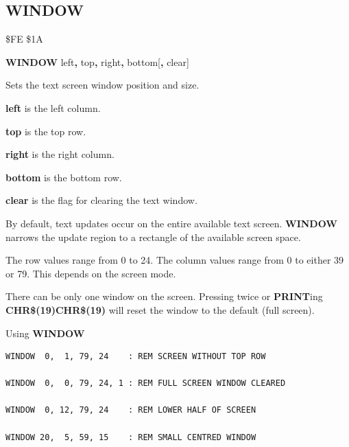 \subsection{WINDOW}
\begin{description}[leftmargin=2cm,style=nextline]
\item [Token:]    \$FE \$1A

\item [Format:]   {\bf WINDOW} left{\bf,} top{\bf,} right{\bf,} bottom[{\bf,} clear]

\item [Usage:]    Sets the text screen window position and size.

                  {\bf left} is the left column.

                  {\bf top} is the top row.

                  {\bf right} is the right column.

                  {\bf bottom} is the bottom row.

                  {\bf clear} is the flag for clearing the text window.

                  By default, text updates occur on the entire available text screen. {\bf WINDOW} narrows the update region to a rectangle of the available screen space.

\item [Remarks:]  The row values range from 0 to 24. The column values range from 0 to either 39 or 79. This depends on the screen mode.

                  There can be only one window on the screen. Pressing  twice or {\bf PRINT}ing {\bf CHR\$(19)CHR\$(19)} will reset the window to the default (full screen).

\item [Examples:] Using {\bf WINDOW}

\begin{tcolorbox}[colback=black,coltext=white]
\verbatimfont{\codefont}
\begin{verbatim}
WINDOW  0,  1, 79, 24    : REM SCREEN WITHOUT TOP ROW

WINDOW  0,  0, 79, 24, 1 : REM FULL SCREEN WINDOW CLEARED

WINDOW  0, 12, 79, 24    : REM LOWER HALF OF SCREEN

WINDOW 20,  5, 59, 15    : REM SMALL CENTRED WINDOW
\end{verbatim}
\end{tcolorbox}
\end{description}

